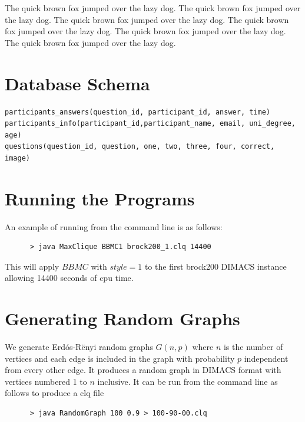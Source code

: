 \documentclass{l4proj}
\begin{document}
The quick brown fox jumped over the lazy dog.
The quick brown fox \cite{am97} jumped over the lazy dog.
The quick brown fox jumped over the lazy dog.
The quick brown fox jumped over the lazy dog.
The quick brown fox jumped over the lazy dog.
The quick brown fox jumped over the lazy dog.

\begin{appendices}

\chapter{Database Schema}

\begin{verbatim}
participants_answers(question_id, participant_id, answer, time)
participants_info(participant_id,participant_name, email, uni_degree, age)
questions(question_id, question, one, two, three, four, correct, image)
\end{verbatim}


\chapter{Running the Programs}
An example of running from the command line is as follows:
\begin{verbatim}
      > java MaxClique BBMC1 brock200_1.clq 14400
\end{verbatim}
This will apply $BBMC$ with $style = 1$ to the first brock200 DIMACS instance allowing 14400 seconds of cpu time.

\chapter{Generating Random Graphs}
\label{sec:randomGraph}
We generate Erd\'{o}s-R\"{e}nyi random graphs $G(n,p)$ where $n$ is the number of vertices and
each edge is included in the graph with probability $p$ independent from every other edge. It produces
a random graph in DIMACS format with vertices numbered 1 to $n$ inclusive. It can be run from the command line as follows to produce 
a clq file
\begin{verbatim}
      > java RandomGraph 100 0.9 > 100-90-00.clq
\end{verbatim}
\end{appendices}




\end{document}
